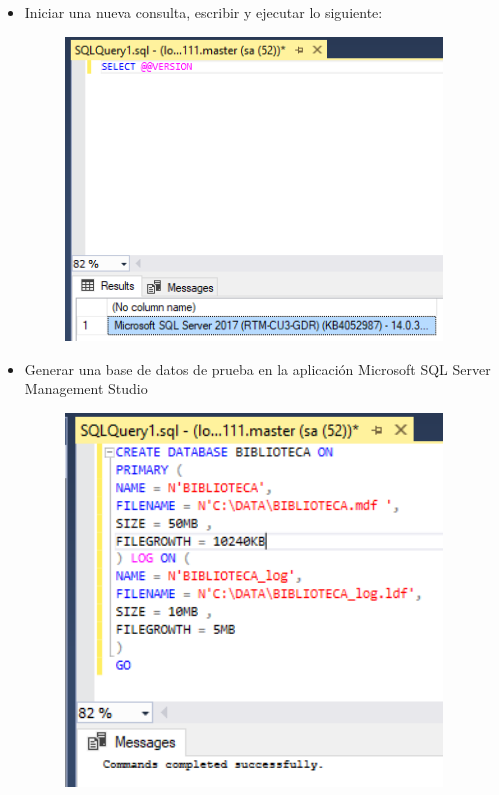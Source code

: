 \begin{itemize}
\begin{figure}[H]
\begin{center}
		\end{center}
		\end{figure}  
         \item Iniciar una nueva consulta, escribir y ejecutar lo siguiente:
		\begin{figure}[H]
		\begin{center}
		\includegraphics[width=10cm]{./Imagenes/c6}
		\end{center}
		\end{figure}  
          \item Generar una base de datos de prueba en la aplicación Microsoft SQL Server Management Studio
		\begin{figure}[H]
		\begin{center}
		\includegraphics[width=10cm]{./Imagenes/c7}
		\end{center}
		\end{figure}  

\end{itemize}
